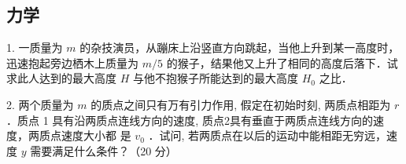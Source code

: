 
\subsection{力学}
1. 一质量为 $m$ 的杂技演员，从蹦床上沿竖直方向跳起，当他上升到某一高度时，迅速抱起旁边栖木上质量为 $m/5$ 的猴子，结果他又上升了相同的高度后落下．试求此人达到的最大高度 $H$ 与他不抱猴子所能达到的最大高度 $H_{0}$ 之比．

2. 两个质量为 $m$ 的质点之间只有万有引力作用, 假定在初始时刻, 两质点相距为 $r$ ．质点 1 具有沿两质点连线方向的速度, 质点2具有垂直于两质点连线方向的速度，两质点速度大小都 是 $v_{0}$ ．试问, 若两质点在以后的运动中能相距无穷远，速度 $y$ 需要满足什么条件？（20 分）